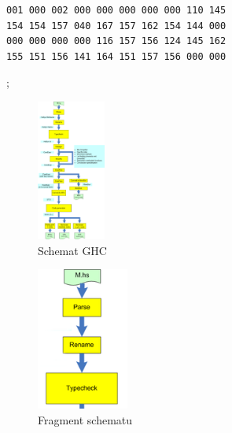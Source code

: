 \documentclass[polish]{beamer}
\makeatletter
\newcommand*{\currentname}{\@currentlabelname}
\makeatother
\begin{document}
\begin{frame}[t,fragile]{\currentname}
{\begin{minipage}{0.5\textwidth}
\begin{block}{}%
\begin{lstlisting}[basicstyle=\tiny\ttfamily]
001 000 002 000 000 000 000 000 110 145
154 154 157 040 167 157 162 154 144 000
000 000 000 000 116 157 156 124 145 162
155 151 156 141 164 151 157 156 000 000
\end{lstlisting}
\end{block}
\end{minipage}
};%
%
\end{frame}

\begin{frame}[c]{\currentname}
    \begin{multicols}{2}
    \begin{figure}[H]
        \includegraphics[width=0.2\textwidth]{images/aosa-compiler}
        \caption{Schemat GHC \cite{AOSA}}
    \end{figure}
    \begin{figure}[H]
        \includegraphics[width=0.27\textwidth]{images/aosa-compiler-cut}
        \caption{Fragment schematu \cite{AOSA}}
    \end{figure}
    \end{multicols}
\end{frame}
\end{document}
